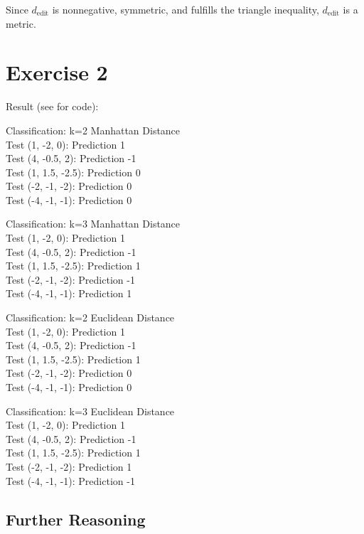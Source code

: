 \documentclass[12pt]{article}
\begin{document}
Since $d_{\text{edit}}$ is nonnegative, symmetric, and fulfills the triangle inequality, $d_{\text{edit}}$ is a metric.

\pagebreak
\section*{Exercise 2}
Result (see  for code):
\bigskip

Classification: k=2 Manhattan Distance \\
Test (1, -2, 0): Prediction 1 \\
Test (4, -0.5, 2): Prediction -1 \\
Test (1, 1.5, -2.5): Prediction 0 \\
Test (-2, -1, -2): Prediction 0 \\
Test (-4, -1, -1): Prediction 0
\bigskip

Classification: k=3 Manhattan Distance \\
Test (1, -2, 0): Prediction 1 \\
Test (4, -0.5, 2): Prediction -1 \\
Test (1, 1.5, -2.5): Prediction 1 \\
Test (-2, -1, -2): Prediction -1 \\
Test (-4, -1, -1): Prediction 1
\bigskip

Classification: k=2 Euclidean Distance \\
Test (1, -2, 0): Prediction 1 \\
Test (4, -0.5, 2): Prediction -1 \\
Test (1, 1.5, -2.5): Prediction 1 \\
Test (-2, -1, -2): Prediction 0 \\
Test (-4, -1, -1): Prediction 0
\bigskip

Classification: k=3 Euclidean Distance \\
Test (1, -2, 0): Prediction 1 \\
Test (4, -0.5, 2): Prediction -1 \\
Test (1, 1.5, -2.5): Prediction 1 \\
Test (-2, -1, -2): Prediction 1 \\
Test (-4, -1, -1): Prediction -1
\bigskip

\subsection*{Further Reasoning}
\end{document}
